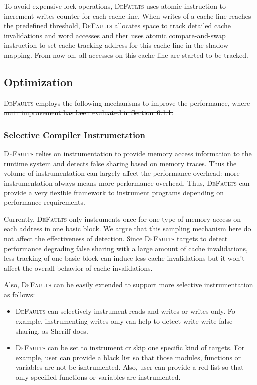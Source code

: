 \documentclass[10pt]{sigplanconf}
\newcommand{\Defaults}{{\scshape DeFaults}}
\newcommand{\defaults}{{\scshape DeFaults}}
\providecommand{\DIFadd}[1]{{\protect\color{blue}\uwave{#1}}} %
\providecommand{\DIFdel}[1]{{\protect\color{red}\sout{#1}}}                      %
\providecommand{\DIFaddbegin}{} %
\providecommand{\DIFaddend}{} %
\providecommand{\DIFdelbegin}{} %
\providecommand{\DIFdelend}{} %
\begin{document}
To avoid expensive lock operations, \defaults{} uses atomic instruction to increment 
writes counter for each cache line. 
When writes of a cache line reaches the predefined threshold,
\defaults{} allocates space to track detailed cache invalidations and word accesses and then 
uses atomic compare-and-swap instruction to set cache tracking address for this cache line in
the shadow mapping. From now on, all accesses on this cache line are started to be tracked.

\subsection{Optimization}
\label{optimization}

\defaults{} employs the following mechanisms to improve the performance\DIFdelbegin \DIFdel{, where main improvement has been evaluated in Section~\ref{}.
}\DIFdelend \DIFaddbegin \DIFadd{.
}\DIFaddend 

\subsubsection{Selective Compiler Instrumetation}
\defaults{} relies on instrumentation to provide memory access information to the runtime system 
and detects false sharing based on memory traces. 
Thus the volume of instrumentation can largely affect the performance overhead: more 
instrumentation always means more performance overhead. 
Thus, \defaults{} can provide a very flexible framework to instrument programs depending on performance requirements. 

Currently, \Defaults{} only instruments once for one type of memory access on each address 
in one basic block. 
We argue that this sampling mechanism here do not affect the effectiveness of detection. 
Since \Defaults{} targets to detect performance degrading false sharing with a large amount of cache invalidations,
less tracking of one basic block can induce less cache invalidations but it won't affect the overall behavior of cache invalidations. 

Also, \defaults{} can be easily extended to support more selective instrumentation as follows:
\begin{itemize}
\item
\Defaults{} can selectively instrument reads-and-writes or writes-only. Fo example, instrumenting writes-only can help to detect write-write false sharing, as Sheriff does. 
\item
\Defaults{} can be set to instrument or skip one specific kind of targets. For example, user can provide a black list so that those modules,
functions or variables are not be isntrumented. Also, user can provide a red list so that only specified functions or variables are instrumented. 
\end{itemize}
\end{document}
